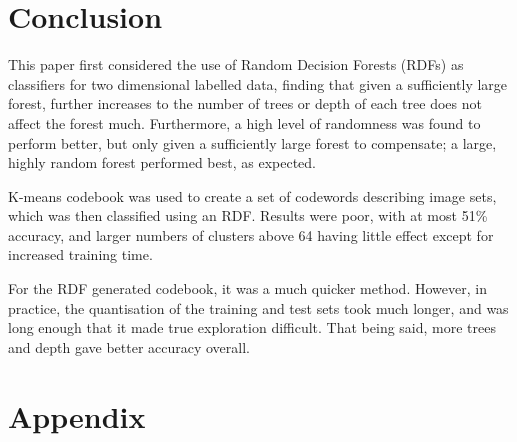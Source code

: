 \documentclass[a4paper, 10pt, conference]{ieeeconf}
\begin{document}
\section{Conclusion}

This paper first considered the use of Random Decision Forests (RDFs) as classifiers for two dimensional labelled data, finding that given a sufficiently large forest, further increases to the number of trees or depth of each tree does not affect the forest much. Furthermore, a high level of randomness was found to perform better, but only given a sufficiently large forest to compensate; a large, highly random forest performed best, as expected.

K-means codebook was used to create a set of codewords describing image sets, which was then classified using an RDF. Results were poor, with at most 51\% accuracy, and larger numbers of clusters above 64 having little effect except for increased training time. 

For the RDF generated codebook, it was a much quicker method. However, in practice, the quantisation of the training and test sets took much longer, and was long enough that it made true exploration difficult. That being said, more trees and depth gave better accuracy overall.




\onecolumn
\section*{Appendix}
\end{document}
